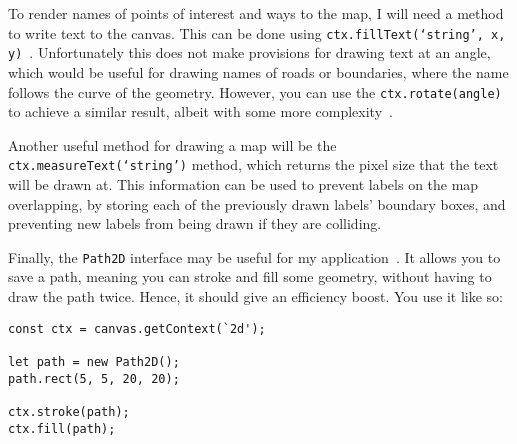 To render names of points of interest and ways to the map, I will need a method to write text to the canvas. This can be done using \texttt{ctx.fillText(`string', x, y)}~\cite{mdn-canvas-draw-text}. Unfortunately this does not make provisions for drawing text at an angle, which would be useful for drawing names of roads or boundaries, where the name follows the curve of the geometry. However, you can use the \texttt{ctx.rotate(angle)} to achieve a similar result, albeit with some more complexity~\cite{mdn-canvas-rotating}.

Another useful method for drawing a map will be the \texttt{ctx.measureText(`string')} method, which returns the pixel size that the text will be drawn at. This information can be used to prevent labels on the map overlapping, by storing each of the previously drawn labels' boundary boxes, and preventing new labels from being drawn if they are colliding.

Finally, the \texttt{Path2D} interface may be useful for my application~\cite{mdn-canvas-path-2d}. It allows you to save a path, meaning you can stroke and fill some geometry, without having to draw the path twice. Hence, it should give an efficiency boost. You use it like so:

\begin{Verbatim}
const ctx = canvas.getContext(`2d');

let path = new Path2D();
path.rect(5, 5, 20, 20);

ctx.stroke(path);
ctx.fill(path);
\end{Verbatim}
